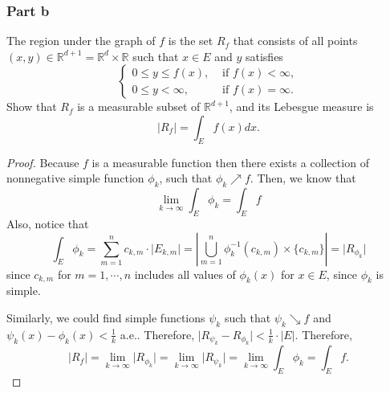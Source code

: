 \subsubsection{Part b}

\begin{question}
    The region under the graph of $f$ is the set $R_f$ that consists of all points $(x, y) \in \mathbb{R}^{d+1}=\mathbb{R}^d \times \mathbb{R}$ such that $x \in E$ and $y$ satisfies
    $$
    \begin{cases}0 \leq y \leq f(x), & \text { if } f(x)<\infty, \\ 0 \leq y<\infty, & \text { if } f(x)=\infty .\end{cases}
    $$
    Show that $R_f$ is a measurable subset of $\mathbb{R}^{d+1}$, and its Lebesgue measure is
    $$
    \left|R_f\right|=\int_E f(x) d x .
    $$
\end{question}

\begin{answer}
    \begin{proof}
        Because $f$ is a measurable function then there exists a collection of nonnegative simple function $\phi_k$, such that $\phi_k \nearrow f$. Then, we know that
        \begin{equation}
            \lim_{k \to \infty} \int_{E} \phi_k = \int_{E}f
        \end{equation}
        Also, notice that 
        \begin{equation}
            \int_E \phi_k = \sum_{m=1}^{n} c_{k,m} \cdot  \lvert E_{k,m}\rvert = \left \lvert \bigcup_{m=1}^{n} \phi_k^{-1}(c_{k,m}) \times \{c_{k,m}\} \right\rvert = \lvert R_{\phi_k} \rvert
        \end{equation}
        since $c_{k,m}$ for $m = 1,\cdots, n$ includes all values of $\phi_k(x)$ for $x \in E$, since $\phi_k$ is simple.
        
        Similarly, we could find simple functions $\psi_k$ such that $\psi_k \searrow f$ and $\psi_k(x) - \phi_k(x) < \tfrac{1}{k}$ a.e.. Therefore, $\lvert R_{\psi_k} - R_{\phi_k} \rvert < \tfrac{1}{k}\cdot \lvert E \rvert$. Therefore, 
        \begin{equation}
            \lvert R_f \rvert = \lim_{k\to \infty} \lvert R_{\phi_k} \rvert = \lim_{k \to \infty} \lvert R_{\psi_k} \rvert = \lim_{k \to \infty} \int_{E} \phi_k = \int_{E}f.
        \end{equation}
    \end{proof}
\end{answer}